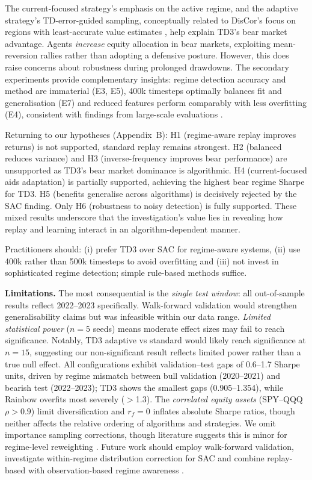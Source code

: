 \documentclass[11pt,a4paper]{article}
\begin{document}
The current-focused strategy's emphasis on the active regime, and the adaptive strategy's TD-error-guided sampling, conceptually related to DisCor's focus on regions with least-accurate value estimates \citep{kumar2020discor}, help explain TD3's bear market advantage. Agents \emph{increase} equity allocation in bear markets, exploiting mean-reversion rallies rather than adopting a defensive posture. However, this does raise concerns about robustness during prolonged drawdowns. The secondary experiments provide complementary insights: regime detection accuracy and method are immaterial (E3, E5), 400k timesteps optimally balances fit and generalisation (E7) and reduced features perform comparably with less overfitting (E4), consistent with findings from large-scale evaluations \citep{ayari2025feature}.

Returning to our hypotheses (Appendix~B): H1 (regime-aware replay improves returns) is not supported, standard replay remains strongest. H2 (balanced reduces variance) and H3 (inverse-frequency improves bear performance) are unsupported as TD3's bear market dominance is algorithmic. H4 (current-focused aids adaptation) is partially supported, achieving the highest bear regime Sharpe for TD3. H5 (benefits generalise across algorithms) is decisively rejected by the SAC finding. Only H6 (robustness to noisy detection) is fully supported. These mixed results underscore that the investigation’s value lies in revealing how replay and learning interact in an algorithm-dependent manner.

Practitioners should: (i) prefer TD3 over SAC for regime-aware systems, (ii) use 400k rather than 500k timesteps to avoid overfitting and (iii) not invest in sophisticated regime detection; simple rule-based methods suffice.

\textbf{Limitations.} The most consequential is the \textit{single test window}: all out-of-sample results reflect 2022--2023 specifically. Walk-forward validation would strengthen generalisability claims but was infeasible within our data range. \textit{Limited statistical power} ($n = 5$ seeds) means moderate effect sizes may fail to reach significance. Notably, TD3 adaptive vs standard would likely reach significance at $n = 15$, suggesting our non-significant result reflects limited power rather than a true null effect. All configurations exhibit validation--test gaps of 0.6--1.7 Sharpe units, driven by regime mismatch between bull validation (2020--2021) and bearish test (2022--2023); TD3 shows the smallest gaps (0.905--1.354), while Rainbow overfits most severely ($>$1.3). The \textit{correlated equity assets} (SPY--QQQ $\rho > 0.9$) limit diversification and $r_f = 0$ inflates absolute Sharpe ratios, though neither affects the relative ordering of algorithms and strategies. We omit importance sampling corrections, though literature suggests this is minor for regime-level reweighting \citep{fedus2020replay, daley2021stratified}. Future work should employ walk-forward validation, investigate within-regime distribution correction for SAC \citep{li2024roer} and combine replay-based with observation-based regime awareness \citep{nixon2025regime}.
\end{document}
